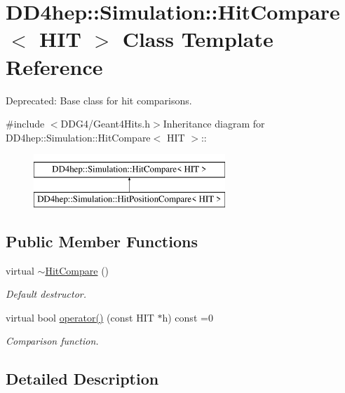 \hypertarget{class_d_d4hep_1_1_simulation_1_1_hit_compare}{
\section{DD4hep::Simulation::HitCompare$<$ HIT $>$ Class Template Reference}
\label{class_d_d4hep_1_1_simulation_1_1_hit_compare}
}


Deprecated: Base class for hit comparisons.  


{\ttfamily \#include $<$DDG4/Geant4Hits.h$>$}Inheritance diagram for DD4hep::Simulation::HitCompare$<$ HIT $>$::\begin{figure}[H]
\begin{center}
\leavevmode
\includegraphics[height=2cm]{class_d_d4hep_1_1_simulation_1_1_hit_compare}
\end{center}
\end{figure}
\subsection*{Public Member Functions}
\begin{DoxyCompactItemize}
\item 
virtual \hyperlink{class_d_d4hep_1_1_simulation_1_1_hit_compare_a33e13448c6cda44f7d56a13e414635b3}{$\sim$HitCompare} ()
\begin{DoxyCompactList}\small\item\em Default destructor. \item\end{DoxyCompactList}\item 
virtual bool \hyperlink{class_d_d4hep_1_1_simulation_1_1_hit_compare_a025eaffc34d0aad36988120c7d158ec7}{operator()} (const HIT $\ast$h) const =0
\begin{DoxyCompactList}\small\item\em Comparison function. \item\end{DoxyCompactList}\end{DoxyCompactItemize}


\subsection{Detailed Description}

